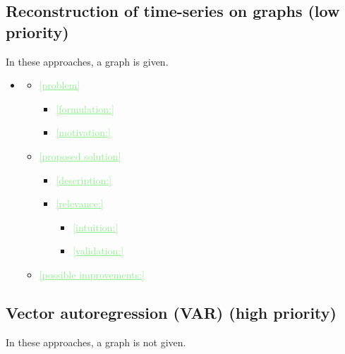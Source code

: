 \documentclass[11pt,final,onecolumn]{IEEEtran}
\newcommand{\cmt}[1]{\noindent\textcolor{lightgreen}{\underline{[#1]}}} %
\newcommand{\cmt}[1]{} %
\begin{document}
\subsection{Reconstruction of time-series on graphs (low priority)}
In these approaches, a graph is given.

\begin{itemize}
\item \cite{romero2017spacetime}
        \begin{itemize}
    \item\cmt{problem}
      \begin{itemize}
      \item\cmt{formulation:}
      \item\cmt{motivation:}
      \end{itemize}      
    \item\cmt{proposed solution}
      \begin{itemize}
      \item\cmt{description:}
      \item\cmt{relevance:}
        \begin{itemize}
        \item\cmt{intuition:}
        \item\cmt{validation:}
        \end{itemize}      
      \end{itemize}
    \item\cmt{possible improvements:}
    \end{itemize}

\end{itemize}


\subsection{Vector autoregression (VAR) (high priority)}
In these approaches, a graph is not given. 
\end{document}
